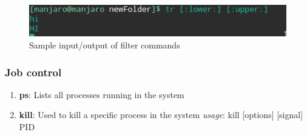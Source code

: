 \documentclass{article}
\begin{document}
\begin{itemize}
\begin{figure}[h!]
         \includegraphics[width=.80\textwidth]{img/p2/ss8.png}
        \caption{Sample input/output of filter commands}
    \end{figure}
\end{itemize}

\subsubsection{Job control}
\begin{enumerate}
    \item {\bf ps}: Lists all processes running in the system\newline
    \item {\bf kill}: Used to kill a specific process in the system\newline
    \hspace{\parindent} {\em usage}: kill [options] [signal] PID\newline
    

\end{enumerate}
\end{document}
